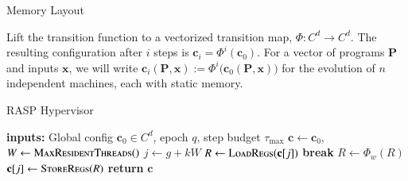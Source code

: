 \documentclass{beamer}
\begin{document}
\begin{frame}{Memory Layout}
  \vspace{.5cm}

Lift the transition function to a vectorized transition map, \(\Phi:C^d\to C^d\). The resulting configuration after \(i\) steps is \( \mathbf c_i=\Phi^i(\mathbf c_0).\) For a vector of programs \(\mathbf{P}\) and inputs \(\mathbf x\), we will write \( \mathbf c_i(\mathbf P,\mathbf x):=\Phi^i\bigl(\mathbf c_0(\mathbf P,\mathbf x)\bigr)\) for the evolution of $n$ independent machines, each with static memory.

\end{frame}

\begin{frame}{RASP Hypervisor}
\begin{algorithm}[H]
\caption{Striped round-robin RASP hypervisor}
\label{alg:hypervisor}
\small
\begin{algorithmic}[1]
\State \textbf{inputs:} Global config \(\mathbf c_0 \in C^d\), epoch \(q\), step budget \(\tau_{\max}\)
\State \(\mathbf c \gets \mathbf c_0\), \(W \gets \textsc{MaxResidentThreads}()\)
 
 
 
\State \(j \gets g + kW\) 
 
\State \(R \gets \textsc{LoadRegs}(\mathbf c[j])\)
 
 \textbf{break} \EndIf
\State \(R \gets \Phi_w(R)\) 
\EndFor
\State \(\mathbf c[j] \gets \textsc{StoreRegs}(R)\)
\EndIf
\EndFor
\EndFor
\EndFor
\State \textbf{return} \(\mathbf c\)
\end{algorithmic}
\end{algorithm}
\end{frame}
\end{document}
